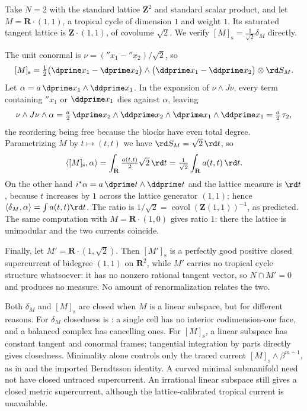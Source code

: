 \begin{example}
\label{ex:ch14-diagonal-line}
Take $N=2$ with the standard lattice $\mathbf Z^2$ and standard scalar
product, and let $M=\mathbf R\cdot(1,1)$, a tropical cycle of dimension $1$
and weight $1$.  Its saturated tangent lattice is $\mathbf Z\cdot(1,1)$, of
covolume $\sqrt2$.  We verify $[M]_{\mathrm s}=\tfrac1{\sqrt2}\delta_M$
directly.

The unit conormal is $\nu=(\dprime x_1-\dprime x_2)/\sqrt2$, so
\[
 [M]_{\mathrm s}
 =\tfrac12\bigl(\dprime x_1-\dprime x_2\bigr)
   \wedge\bigl(\ddprime x_1-\ddprime x_2\bigr)\otimes\rd S_M .
\]
Let $\alpha=a\,\dprime x_1\wedge\ddprime x_1$.  In the expansion of
$\nu\wedge J\nu$, every term containing $\dprime x_1$ or $\ddprime x_1$ dies
against $\alpha$, leaving
\[
 \nu\wedge J\nu\wedge\alpha
 =\tfrac a2\,\dprime x_2\wedge\ddprime x_2\wedge
   \dprime x_1\wedge\ddprime x_1
 =\tfrac a2\,\tau_2 ,
\]
the reordering being free because the blocks have even total degree.
Parametrizing $M$ by $t\mapsto(t,t)$ we have $\rd S_M=\sqrt2\,\rd t$, so
\[
 \langle[M]_{\mathrm s},\alpha\rangle
 =\int_{\mathbf R}\tfrac{a(t,t)}2\sqrt2\,\rd t
 =\tfrac1{\sqrt2}\int_{\mathbf R}a(t,t)\,\rd t .
\]
On the other hand $i^*\alpha=a\,\dprime t\wedge\ddprime t$ and the lattice
measure is $\rd t$, because $t$ increases by $1$ across the lattice
generator $(1,1)$; hence
$\langle\delta_M,\alpha\rangle=\int a(t,t)\rd t$.  The ratio is
$1/\sqrt2=\operatorname{covol}(\mathbf Z(1,1))^{-1}$, as predicted.  The same
computation with $M=\mathbf R\cdot(1,0)$ gives ratio $1$: there the lattice
is unimodular and the two currents coincide.

Finally, let $M'=\mathbf R\cdot(1,\sqrt2)$.  Then $[M']_{\mathrm s}$ is a
perfectly good positive closed supercurrent of bidegree $(1,1)$ on
$\mathbf R^2$, while $M'$ carries no tropical cycle structure whatsoever: it
has no nonzero rational tangent vector, so $N\cap M'=0$ and
 produces no measure.  No amount of
renormalization relates the two.
\end{example}

\begin{remark}
\label{rem:ch14-closedness-two-reasons}
Both $\delta_M$ and $[M]_{\mathrm s}$ are closed when $M$ is a linear
subspace, but for different reasons.  For $\delta_M$ closedness is
: a single cell has no interior
codimension-one face, and a balanced complex has cancelling ones.  For $[M]_{\mathrm s}$, a linear subspace has constant tangent and conormal
frames; tangential integration by parts directly gives closedness.
Minimality alone controls only the traced current
$[M]_{\mathrm s}\wedge\beta^{m-1}$, as in
 and the imported Berndtsson identity.
A curved minimal submanifold need not have closed untraced supercurrent.
An irrational linear subspace still gives a closed metric supercurrent,
although the lattice-calibrated tropical current is unavailable.
\end{remark}

